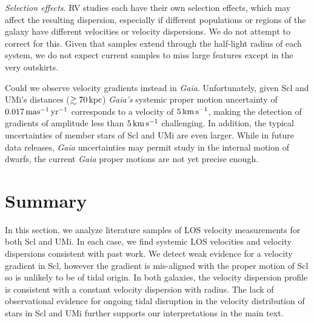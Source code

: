 \emph{Selection effects}. RV studies each have their own selection
effects, which may affect the resulting dispersion, especially if
different populations or regions of the galaxy have different velocities
or velocity dispersions. We do not attempt to correct for this. Given
that samples extend through the half-light radius of each system, we do
not expect current samples to miss large features except in the very
outskirts.

Could we observe velocity gradients instead in \emph{Gaia}.
Unfortunately, given Scl and UMi's distances (\(\gtrsim 70\,{\rm kpc}\))
\emph{Gaia's} systemic proper motion uncertainty of \(0.017\,{\rm mas^{-1}\,yr^{-1}}\)
corresponds to a velocity of \(5\,{\rm km\,s^{-1}}\), making the detection of
gradients of amplitude less than \(5\,{\rm km\,s^{-1}}\) challenging. In addition,
the typical uncertainties of member stars of Scl and UMi are even
larger. While in future data releases, \emph{Gaia} uncertainties may
permit study in the internal motion of dwarfs, the current \emph{Gaia}
proper motions are not yet precise enough.

\section{Summary}\label{summary}

In this section, we analyze literature samples of LOS velocity
measurements for both Scl and UMi. In each case, we find systemic LOS
velocities and velocity dispersions consistent with past work. We detect
weak evidence for a velocity gradient in Scl, however the gradient is
mis-aligned with the proper motion of Scl so is unlikely to be of tidal
origin. In both galaxies, the velocity dispersion profile is consistent
with a constant velocity dispersion with radius. The lack of
observational evidence for ongoing tidal disruption in the velocity
distribution of stars in Scl and UMi further supports our
interpretations in the main text.
